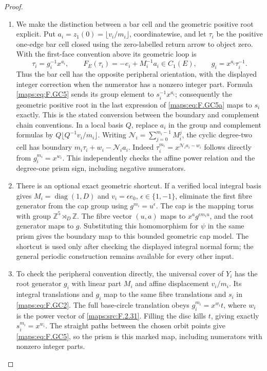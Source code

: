 \begin{proof}
\begin{enumerate}[label=\arabic*.]
\item We make the distinction between a bar cell and the geometric
positive root explicit.  Put
$a_i=z_1(0)=\lfloor v_i/m_i\rfloor$, coordinatewise, and
let $\tau_i$ be the positive one-edge bar cell closed using
the zero-labelled return arrow to object zero.  With the
first-face convention above its geometric loop is
\[
 \tau_i=g_i^{-1}x^{a_i},\qquad
 F_E(\tau_i)=-e_i+M_i^{-1}a_i\in C_1(E),\qquad
 g_i=x^{a_i}\tau_i^{-1}.                                  \tag{F.GC5a}\label{maps:eq:F.GC5a}
\]
Thus the bar cell has the opposite peripheral orientation,
with the displayed integer correction when the numerator
has a nonzero integer part.  Formula \eqref{maps:eq:F.GC5} sends its
group element to $s_i^{-1}x^{a_i}$; consequently the
geometric positive root in the last expression of \eqref{maps:eq:F.GC5a}
maps to $s_i$ exactly.  This is the stated conversion between
the boundary and complement chain conventions.  In a local basis
$Q$, replace $a_i$ in the group and complement formulas by
$Q\lfloor Q^{-1}v_i/m_i\rfloor$.
Writing $\mathcal N_i=\sum_{j=0}^{m_i-1}M_i^j$, the cyclic
degree-two cell has boundary
$m_i\tau_i+w_i-\mathcal N_i a_i$.
Indeed $\tau_i^{m_i}=x^{\mathcal N_i a_i-w_i}$ follows
directly from $g_i^{m_i}=x^{w_i}$.
This independently checks the affine power relation and
the degree-one prism sign, including negative numerators.

\item There is an optional exact geometric shortcut.  If a verified
local integral basis gives $M_i=\operatorname{diag}(1,D)$ and
$v_i=\epsilon e_0$, $\epsilon\in\{1,-1\}$, eliminate the
first fibre generator from the cap group using
$g^{m_i}=u^\epsilon$.  The cap is the mapping torus with
group $\mathbb Z^5\rtimes_D\mathbb Z$.
The fibre vector $(u,a)$ maps to $x^a g^{\epsilon m_i u}$,
and the root generator maps to $g$.  Substituting this
homomorphism for $\psi$ in the same prism gives the boundary
map to this bounded geometric cap model.  The shortcut is
used only after checking the displayed integral normal form;
the general periodic construction remains available for
every other input.

\item To check the peripheral convention directly, the universal
cover of $Y_i$ has the root generator $g_i$ with linear part
$M_i$ and affine displacement $v_i/m_i$.  Its integral
translations and $g_i$ map to the same fibre translations
and $s_i$ in \eqref{maps:eq:F.GC2}.  The full base-circle translation obeys
$g_i^{m_i}=x^{w_i}t$, where $w_i$ is the power vector of
\ref{maps:src:F.2.31}.  Filling the disc kills $t$, giving exactly
$s_i^{m_i}=x^{w_i}$.  The straight paths between the chosen
orbit points give \eqref{maps:eq:F.GC5}, so the prism is this marked map,
including numerators with nonzero integer parts.


\end{enumerate}
\end{proof}
